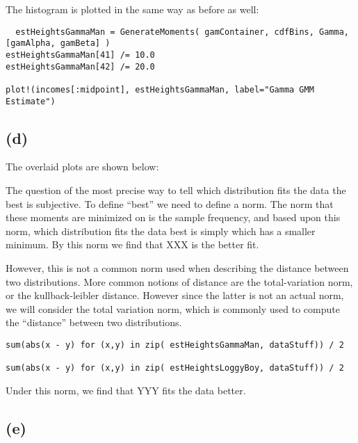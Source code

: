 \documentclass[12pt]{paper}
\begin{document}
The histogram is plotted in the same way as before as well:

\begin{verbatim}
  estHeightsGammaMan = GenerateMoments( gamContainer, cdfBins, Gamma, [gamAlpha, gamBeta] )
estHeightsGammaMan[41] /= 10.0
estHeightsGammaMan[42] /= 20.0

plot!(incomes[:midpoint], estHeightsGammaMan, label="Gamma GMM Estimate")
\end{verbatim}

\subsection{(d)}

The overlaid plots are shown below:


The question of the most precise way to tell which distribution fits
the data the best is subjective. To define ``best'' we need to define
a norm. The norm that these moments are minimized on is the sample
frequency, and based upon this norm, which distribution fits the data
best is simply which has a smaller minimum. By this norm we find that
XXX is the better fit.

However, this is not a common norm used when describing the distance
between two distributions. More common notions of distance are the
total-variation norm, or the kullback-leibler
distance. However since the latter is not an actual norm, we will
consider the total variation norm, which is commonly used to compute
the ``distance'' between two distributions.

\begin{verbatim}
sum(abs(x - y) for (x,y) in zip( estHeightsGammaMan, dataStuff)) / 2

sum(abs(x - y) for (x,y) in zip( estHeightsLoggyBoy, dataStuff)) / 2
\end{verbatim}

Under this norm, we find that YYY fits the data better.

\subsection{(e)}
\end{document}
